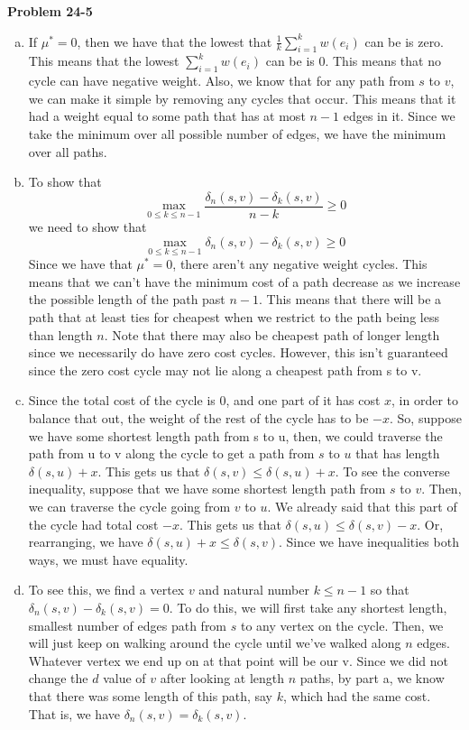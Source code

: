 \documentclass{article}
\begin{document}
\noindent\textbf{Problem 24-5}\\
\begin{enumerate}[a.]
\item
If $\mu^* =0$, then we have that the lowest that $\frac{1}{k}\sum_{i=1}^k w(e_i)$ can be is zero. This means that the lowest $\sum_{i=1}^k w(e_i)$ can be is 0. This means that no cycle can have negative weight. Also, we know that for any path from $s$ to $v$, we can make it simple by removing any cycles that occur. This means that it had a weight equal to some path that has at most $n-1$ edges in it. Since we take the minimum over all possible number of edges, we have the minimum over all paths.
\item
To show that 
\[
\max_{0\le k\le n-1} \frac{\delta_n(s,v) - \delta_k(s,v)}{n-k} \ge 0
\]
we need to show that
\[
\max_{0\le k\le n-1} \delta_n(s,v) - \delta_k(s,v) \ge 0
\]
Since we have that $\mu^*=0$, there aren't any negative weight cycles. This means that we can't have the minimum cost of a path decrease as we increase the possible length of the path past $n-1$. This means that there will be a path that at least ties for cheapest when we restrict to the path being less than length $n$. Note that there may also be cheapest path of longer length since we necessarily do have zero cost cycles. However, this isn't guaranteed since the zero cost cycle may not lie along a cheapest path from s to v.

\item
Since the total cost of the cycle is 0, and one part of it has cost $x$, in order to balance that out, the weight of the rest of the cycle has to be $-x$. So, suppose we have some shortest length path from s to u, then, we could traverse the path from u to v along the cycle to get a path from $s$ to $u$ that has length $\delta(s,u)+x$. This gets us that $\delta(s,v) \le \delta(s,u)+x$. To see the converse inequality, suppose that we have some shortest length path from $s$ to $v$. Then, we can traverse the cycle going from $v$ to $u$. We already said that this part of the cycle had total cost $-x$. This gets us that $\delta(s,u) \le \delta(s,v)-x$. Or, rearranging, we have $\delta(s,u)+x \le \delta(s,v)$. Since we have inequalities both ways, we must have equality.

\item
To see this, we find a vertex $v$ and natural number $k\le n-1$ so that $\delta_n(s,v) - \delta_k(s,v) =0$. To do this, we will first take any shortest length, smallest number of edges path from $s$ to any vertex on the cycle. Then, we will just keep on walking around the cycle until we've walked along $n$ edges. Whatever vertex we end up on at that point will be our v. Since we did not change the $d$ value of $v$ after looking at length $n$ paths, by part a, we know that there was some length of this path, say $k$, which had the same cost. That is, we have $\delta_n(s,v) = \delta_k(s,v)$.


\end{enumerate}
\end{document}
